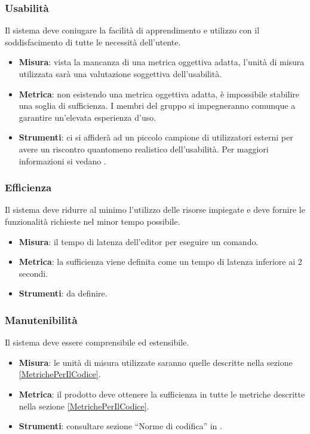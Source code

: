 \documentclass[../PianoDiQualifica.tex]{subfiles}
\begin{document}
			\subsubsection{Usabilità}
				Il sistema deve coniugare la facilità di apprendimento e
				utilizzo con il soddisfacimento di tutte le necessità dell'utente.
				\begin{itemize}
					\item \textbf{Misura}: vista la mancanza di una metrica
					oggettiva adatta, l'unità di misura utilizzata sarà una
					valutazione soggettiva dell'usabilità.
					\item \textbf{Metrica}: non esistendo una metrica oggettiva
					adatta, è impossibile stabilire una soglia di sufficienza.
					I membri del gruppo si impegneranno comunque a garantire
					un'elevata esperienza d'uso.
					\item \textbf{Strumenti}: ci si affiderà ad un piccolo
					campione di utilizzatori esterni per avere un riscontro
					quantomeno realistico dell'usabilità. Per maggiori
					informazioni si vedano \normediprogettov.
				\end{itemize}
			\subsubsection{Efficienza}
				Il sistema deve ridurre al minimo l'utilizzo delle risorse
				impiegate e deve fornire le funzionalità richieste nel minor tempo
				possibile.
				\begin{itemize}
					\item \textbf{Misura}: il tempo di latenza dell'editor per
					eseguire un comando.
					\item \textbf{Metrica}: la sufficienza viene definita come un
					tempo di latenza inferiore ai 2 secondi.
					\item \textbf{Strumenti}: da definire.
				\end{itemize}
			\subsubsection{Manutenibilità}
				Il sistema deve essere comprensibile ed estensibile.
				\begin{itemize}
					\item \textbf{Misura}: le unità di misura utilizzate saranno
					quelle descritte nella sezione \ref{MetrichePerIlCodice}.
					\item \textbf{Metrica}: il prodotto deve ottenere la
					sufficienza in tutte le metriche descritte nella sezione
					\ref{MetrichePerIlCodice}.
					\item \textbf{Strumenti}: consultare sezione ``Norme di codifica''
					in \normediprogettov.
				\end{itemize}
\end{document}
